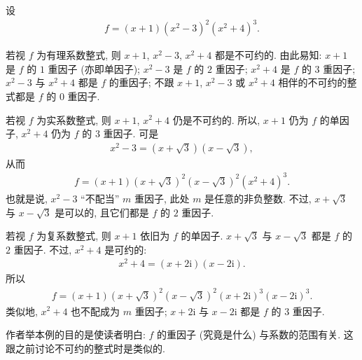 \begin{example}
    设
    \begin{align*}
        f = (x + 1) (x^2 - 3)^2 (x^2 + 4)^3.
    \end{align*}

    若视 $f$ 为有理系数整式, 则 $x+1$, $x^2 - 3$, $x^2 + 4$ 都是不可约的. 由此易知: $x+1$ 是 $f$ 的 $1$ 重因子 (亦即单因子); $x^2 - 3$ 是 $f$ 的 $2$ 重因子; $x^2 + 4$ 是 $f$ 的 $3$ 重因子; $x^2 - 3$ 与 $x^2 + 4$ 都是 $f$ 的重因子; 不跟 $x+1$, $x^2 - 3$ 或 $x^2 + 4$ 相伴的不可约的整式都是 $f$ 的 $0$ 重因子.

    若视 $f$ 为实系数整式, 则 $x+1$, $x^2+4$ 仍是不可约的. 所以, $x+1$ 仍为 $f$ 的单因子, $x^2+4$ 仍为 $f$ 的 $3$ 重因子. 可是
    \begin{align*}
        x^2 - 3 = (x + \sqrt{3}) (x - \sqrt{3}),
    \end{align*}
    从而
    \begin{align*}
        f = (x + 1)(x + \sqrt{3})^2 (x - \sqrt{3})^2 (x^2 + 4)^3.
    \end{align*}
    也就是说, $x^2 - 3$ ``不配当'' $m$ 重因子, 此处 $m$ 是任意的非负整数. 不过, $x + \sqrt{3}$ 与 $x - \sqrt{3}$ 是可以的, 且它们都是 $f$ 的 $2$ 重因子.

    若视 $f$ 为复系数整式, 则 $x+1$ 依旧为 $f$ 的单因子. $x + \sqrt{3}$ 与 $x - \sqrt{3}$ 都是 $f$ 的 $2$ 重因子. 不过, $x^2 + 4$ 是可约的:
    \begin{align*}
        x^2 + 4 = (x + 2\mathrm{i}) (x - 2\mathrm{i}).
    \end{align*}
    所以
    \begin{align*}
        f = (x + 1)(x + \sqrt{3})^2 (x - \sqrt{3})^2 (x + 2\mathrm{i})^3 (x - 2\mathrm{i})^3.
    \end{align*}
    类似地, $x^2 + 4$ 也不配成为 $m$ 重因子; $x + 2\mathrm{i}$ 与 $x - 2\mathrm{i}$ 都是 $f$ 的 $3$ 重因子.

    作者举本例的目的是使读者明白: $f$ 的重因子 (究竟是什么) 与系数的范围有关. 这跟之前讨论不可约的整式时是类似的.
\end{example}

